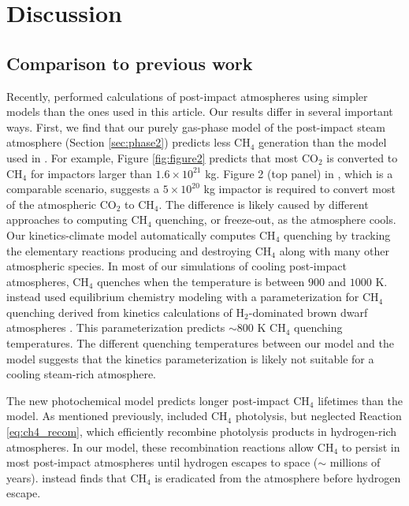 \section{Discussion}

\subsection{Comparison to previous work}

Recently, \citet{Zahnle_2020} performed calculations of post-impact atmospheres using simpler models than the ones used in this article. Our results differ in several important ways. First, we find that our purely gas-phase model of the post-impact steam atmosphere (Section \ref{sec:phase2}) predicts less CH$_4$ generation than the model used in \citet{Zahnle_2020}. For example, Figure \ref{fig:figure2} predicts that most CO$_2$ is converted to CH$_4$ for impactors larger than $1.6 \times 10^{21}$ kg. Figure 2 (top panel) in \citet{Zahnle_2020}, which is a comparable scenario, suggests a $5 \times 10^{20}$ kg impactor is required to convert most of the atmospheric CO$_2$ to CH$_4$. The difference is likely caused by different approaches to computing CH$_4$ quenching, or freeze-out, as the atmosphere cools. Our kinetics-climate model automatically computes CH$_4$ quenching by tracking the elementary reactions producing and destroying CH$_4$ along with many other atmospheric species. In most of our simulations of cooling post-impact atmospheres, CH$_4$ quenches when the temperature is between $900$ and $1000$ K. \citet{Zahnle_2020} instead used equilibrium chemistry modeling with a parameterization for CH$_4$ quenching derived from kinetics calculations of H$_2$-dominated brown dwarf atmospheres \citep{Zahnle_2014}. This parameterization predicts $\sim 800$ K CH$_4$ quenching temperatures. The different quenching temperatures between our model and the \citet{Zahnle_2020} model suggests that the \citet{Zahnle_2020} kinetics parameterization is likely not suitable for a cooling steam-rich atmosphere.

The new photochemical model predicts longer post-impact CH$_4$ lifetimes than the \citet{Zahnle_2020} model. As mentioned previously, \citet{Zahnle_2020} included CH$_4$ photolysis, but neglected Reaction \ref{eq:ch4_recom}, which efficiently recombine photolysis products in hydrogen-rich atmospheres. In our model, these recombination reactions allow CH$_4$ to persist in most post-impact atmospheres until hydrogen escapes to space ($\sim $ millions of years). \citet{Zahnle_2020} instead finds that CH$_4$ is eradicated from the atmosphere before hydrogen escape. 

